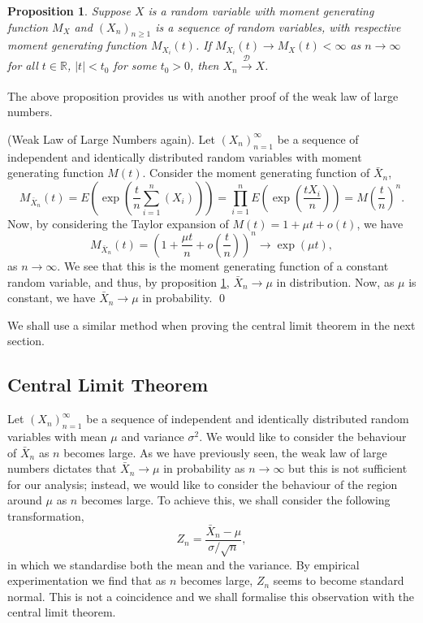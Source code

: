 \documentclass[
]{article}
\newtheorem{prop}{Proposition}[theorem]
\theoremstyle{definition}
\begin{document}
\begin{prop}\label{contin}
  Suppose \(X\) is a random variable with moment generating function \(M_X\) and 
  \((X_n)_{n \ge 1}\) is a sequence of random variables, with respective moment 
  generating function \(M_{X_i}(t)\). If \(M_{X_i}(t) \to M_X(t) < \infty\) as 
  \(n \to \infty\) for all \(t \in \mathbb{R}\), \(\left| t \right| < t_0\) for 
  some \(t_0 > 0\), then \(X_n \xrightarrow[]{\mathcal{D}} X\).
\end{prop}

The above proposition provides us with another proof of the weak law of
large numbers.

\proof (Weak Law of Large Numbers again). Let \((X_n)_{n = 1}^\infty\)
be a sequence of independent and identically distributed random
variables with moment generating function \(M(t)\). Consider the moment
generating function of \(\bar{X}_n\),
\[M_{\bar{X}_n}(t) = E\left(\exp\left(\frac{t}{n}\sum_{i = 1}^n (X_i)\right)\right) = 
    \prod_{i = 1}^n E\left(\exp\left(\frac{tX_i}{n}\right)\right) 
    = M\left(\frac{t}{n}\right)^n.\] Now, by considering the Taylor
expansion of \(M(t) = 1 + \mu t + o(t)\), we have
\[M_{\bar{X}_n}(t) = \left(1 + \frac{\mu t}{n} + o\left(\frac{t}{n}\right)\right)^n 
    \to \exp(\mu t),\] as \(n \to \infty\). We see that this is the
moment generating function of a constant random variable, and thus, by
proposition \ref{contin}, \(\bar{X}_n \to \mu\) in distribution. Now, as
\(\mu\) is constant, we have \(\bar{X}_n \to \mu\) in probability. \qed

We shall use a similar method when proving the central limit theorem in
the next section.

\hypertarget{central-limit-theorem-1}{%
\subsection{Central Limit Theorem}\label{central-limit-theorem-1}}

Let \((X_n)_{n = 1}^\infty\) be a sequence of independent and
identically distributed random variables with mean \(\mu\) and variance
\(\sigma^2\). We would like to consider the behaviour of \(\bar{X}_n\)
as \(n\) becomes large. As we have previously seen, the weak law of
large numbers dictates that \(\bar{X}_n \to \mu\) in probability as
\(n \to \infty\) but this is not sufficient for our analysis; instead,
we would like to consider the behaviour of the region around \(\mu\) as
\(n\) becomes large. To achieve this, we shall consider the following
transformation, \[Z_n = \frac{\bar{X}_n - \mu}{\sigma / \sqrt{n}},\] in
which we standardise both the mean and the variance. By empirical
experimentation we find that as \(n\) becomes large, \(Z_n\) seems to
become standard normal. This is not a coincidence and we shall formalise
this observation with the central limit theorem.
\end{document}
